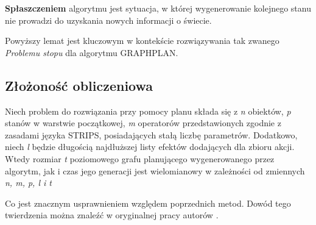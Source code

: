     \begin{definition}
        \textbf{Spłaszczeniem} algorytmu jest sytuacja, w której wygenerowanie kolejnego stanu nie prowadzi 
        do uzyskania nowych informacji o świecie.
    \end{definition}

    Powyższy lemat jest kluczowym w kontekście rozwiązywania tak zwanego \textit{Problemu stopu} dla algorytmu GRAPHPLAN.

    \subsection{Złożoność obliczeniowa}
    \begin{theorem}
        Niech problem do rozwiązania przy pomocy planu składa się z \textit{n} obiektów, \textit{p} stanów 
        w warstwie początkowej, \textit{m} operatorów przedstawionych zgodnie z zasadami języka STRIPS, posiadających 
        stałą liczbę parametrów. Dodatkowo, niech \textit{l} będzie długością najdłuższej listy efektów dodających 
        dla zbioru akcji. Wtedy rozmiar \textit{t} poziomowego grafu planującego wygenerowanego przez algorytm, jak i czas jego generacji 
        jest wielomianowy w zależności od zmiennych \textit{n, m, p, l i t}
    \end{theorem}

    Co jest znacznym usprawnieniem względem poprzednich metod. Dowód tego twierdzenia można znaleźć w oryginalnej pracy 
    autorów \cite{GRAPHPLAN}.

